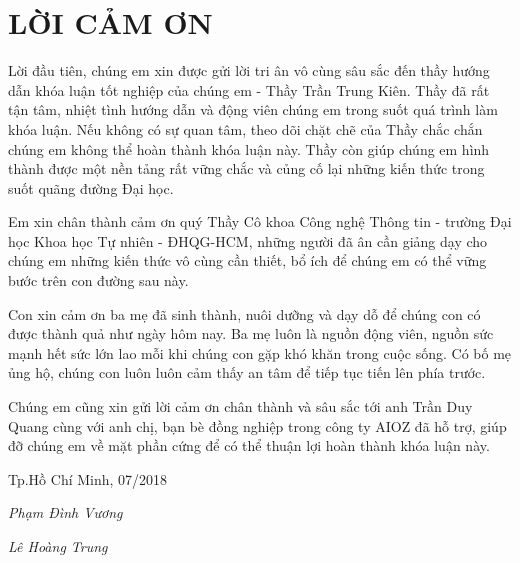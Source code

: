 \newpage
\chapter*{LỜI CẢM ƠN}
Lời đầu tiên, chúng em xin được gửi lời tri ân vô cùng sâu sắc đến thầy hướng dẫn khóa luận tốt nghiệp của chúng em - Thầy Trần Trung Kiên. Thầy đã rất tận tâm, nhiệt tình hướng dẫn và động viên chúng em trong suốt quá trình làm khóa luận. Nếu không có sự quan tâm, theo dõi chặt chẽ của Thầy chắc chắn chúng em không thể hoàn thành khóa luận này. Thầy còn giúp chúng em hình thành được một nền tảng rất vững chắc và củng cố lại những kiến thức trong suốt quãng đường Đại học.

Em xin chân thành cảm ơn quý Thầy Cô khoa Công nghệ Thông tin - trường Đại học Khoa học Tự nhiên - ĐHQG-HCM, những người đã ân cần giảng dạy cho chúng em những kiến thức vô cùng cần thiết, bổ ích để chúng em có thể vững bước trên con đường sau này.

Con xin cảm ơn ba mẹ đã sinh thành, nuôi dưỡng và dạy dỗ để chúng con có được thành quả như ngày hôm nay. Ba mẹ luôn là nguồn động viên, nguồn sức mạnh hết sức lớn lao mỗi khi chúng con gặp khó khăn trong cuộc sống. Có bố mẹ ủng hộ, chúng con luôn luôn cảm thấy an tâm để tiếp tục tiến lên phía trước.

Chúng em cũng xin gửi lời cảm ơn chân thành và sâu sắc tới anh Trần Duy Quang cùng với anh chị, bạn bè đồng nghiệp trong công ty AIOZ đã hỗ trợ, giúp đỡ chúng em về mặt phần cứng để có thể thuận lợi hoàn thành khóa luận này.



\hfill Tp.Hồ Chí Minh, 07/2018

\hfill \textit{Phạm Đình Vương}

\hfill \textit{Lê Hoàng Trung}
